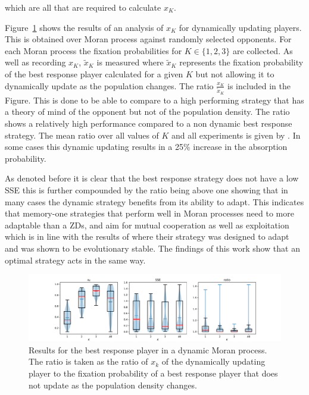 \documentclass[10pt]{article}
\begin{document}
which are all that are required to calculate \(x_K\).

Figure~\ref{fig:dynamic_moran_process_results} shows the results of an analysis
of \(x_K\) for dynamically updating players. 
This is obtained over %
Moran process against randomly selected opponents.
For each Moran process the fixation probabilities for \(K\in\{1, 2, 3\}\) are
collected.
As well as recording \(x_K\), \(\tilde x_K\) is measured where \(\tilde
x_K\) represents the fixation probability of the best response player
calculated for a given \(K\) but not allowing it to dynamically update as the
population changes. The ratio \(\frac{x_K}{\tilde x_K}\) is included in the
Figure. This is done to be able to compare to a high performing strategy that
has a theory of mind of the opponent but not of the population density.
The ratio shows a relatively high performance compared to a non
dynamic best response strategy. The mean ratio over all values of \(K\) and all
experiments is given by %
. In some cases this dynamic updating results in a 25\% increase in the
absorption probability.

As denoted before it is clear that the best response strategy does not have a
low SSE %
this is further compounded by the ratio being above one showing that in many
cases the dynamic strategy benefits from its ability to adapt.
This indicates that memory-one strategies that perform well in Moran processes need to
more adaptable than a ZDs, and aim for mutual cooperation as well as
exploitation which is in line with the results of \cite{Hilbe2018} where their
strategy was designed to adapt and was shown to be evolutionary stable. The
findings of this work show that an optimal strategy acts in the same way.

\begin{figure}[!hbtp]
    \centering
    \includegraphics[width=.9\textwidth]{img/dynamic_moran_process_results/main.pdf}
    \caption{Results for the best response player in a dynamic Moran process.
    The ratio is taken as the ratio of \(x_k\) of the dynamically updating
    player to the fixation probability of a best response player that does not
    update as the population density changes.}\label{fig:dynamic_moran_process_results}
\end{figure}
\end{document}
